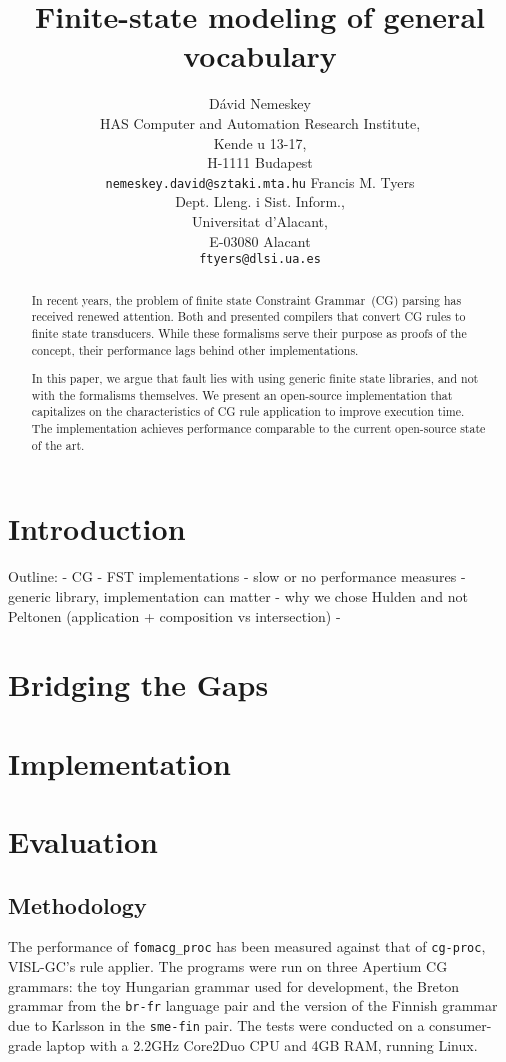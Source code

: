 \documentclass{article}
\title{Finite-state modeling of general vocabulary}
\author{D\'avid Nemeskey\\
 HAS Computer and Automation Research Institute, \\
   Kende u 13-17, \\
   H-1111 Budapest\\
 {\tt nemeskey.david@sztaki.mta.hu}
\And
Francis M. Tyers\\
Dept. Lleng. i Sist. Inform.,\\
Universitat d'Alacant,\\
E-03080 Alacant\\
{\tt ftyers@dlsi.ua.es}}
\date{}
\begin{document}
\maketitle\vspace*{-10mm}

\begin{abstract}
  In recent years, the problem of finite state Constraint Grammar~(CG) parsing has
  received renewed attention. Both  and
   presented compilers that convert CG rules to finite
  state transducers. While these formalisms serve their purpose as proofs of the
  concept, their performance lags behind other implementations.  %
  
  In this paper, we argue that fault lies with using generic finite state
  libraries, and not with the formalisms themselves. We present an open-source
  implementation that capitalizes on the characteristics of CG rule
  application to improve execution time. The implementation achieves performance
  comparable to the current open-source state of the art.
\end{abstract}

\section{Introduction}
Outline:
- CG
- FST implementations
- slow or no performance measures
- generic library, implementation can matter
- why we chose Hulden and not Peltonen (application + composition vs intersection)
- 

\section{Bridging the Gaps}
\label{sec:bridging}

\section{Implementation}
\label{sec:implementation}

\section{Evaluation}
\label{sec:evaluation}

\subsection{Methodology}
The performance of \texttt{fomacg\_proc} has been measured against that of
\texttt{cg-proc}, VISL-GC's rule applier. The programs were run on three
Apertium CG grammars: the toy Hungarian grammar used for development, the Breton
grammar from the \texttt{br-fr} language pair and the version of the Finnish
grammar due to Karlsson in the \texttt{sme-fin} pair. %
The tests were conducted on a consumer-grade laptop with a 2.2GHz Core2Duo CPU
and 4GB RAM, running Linux.
\end{document}
